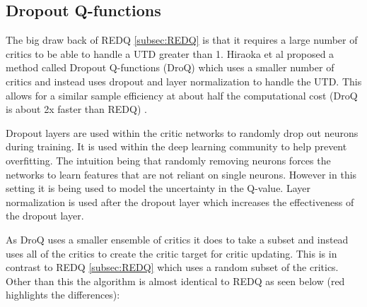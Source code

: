 \subsection{Dropout Q-functions}\label{subsec:DROQ}

The big draw back of REDQ \ref{subsec:REDQ} is that it requires a large number of critics to be able to handle a UTD greater than 1. Hiraoka et al \cite{hiraokaDropoutQFunctionsDoubly2022} proposed a method called Dropout Q-functions (DroQ) which uses a smaller number of critics and instead uses dropout and layer normalization to handle the UTD. This allows for a similar sample efficiency at about half the computational cost (DroQ is about 2x faster than REDQ) \cite{hiraokaDropoutQFunctionsDoubly2022}.

Dropout layers \cite{srivastavaDropoutSimpleWay2014} are used within the critic networks to randomly drop out neurons during training. It is used within the deep learning community to help prevent overfitting. The intuition being that randomly removing neurons forces the networks to learn features that are not reliant on single neurons. However in this setting it is being used to model the uncertainty in the Q-value. Layer normalization \cite{baLayerNormalization2016} is used after the dropout layer which increases the effectiveness of the dropout layer.

As DroQ uses a smaller ensemble of critics it does to take a subset and instead uses all of the critics to create the critic target for critic updating. This is in contrast to REDQ \ref{subsec:REDQ} which uses a random subset of the critics. Other than this the algorithm is almost identical to REDQ as seen below (red highlights the differences):

